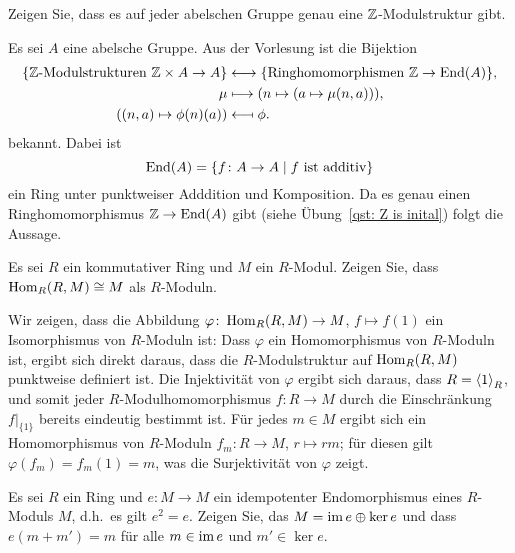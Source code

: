 \begin{question}
  Zeigen Sie, dass es auf jeder abelschen Gruppe genau eine $\mathbb{Z}$-Modulstruktur gibt.
\end{question}


\begin{solution}
  Es sei $A$ eine abelsche Gruppe.
  Aus der Vorlesung ist die Bijektion
  \begin{align*}
    \{\text{$\mathbb{Z}$-Modulstrukturen $\mathbb{Z} \times A \to A$}\}
    &\longleftrightarrow
    \{\text{Ringhomomorphismen $\mathbb{Z} \to \operatorname{End}(A)$}\},
    \\
                    \mu
    &\longmapsto    (n \mapsto (a \mapsto \mu(n,a))),
    \\
                    ( (n,a) \mapsto \phi(n)(a) )
    &\longmapsfrom  \phi.
  \end{align*}
  bekannt.
  Dabei ist
  \[
      \operatorname{End}(A)
    = \{f \colon A \to A \mid \text{$f$ ist additiv}\}
  \]
  ein Ring unter punktweiser Adddition und Komposition.
  Da es genau einen Ringhomomorphismus $\mathbb{Z} \to \operatorname{End}(A)$ gibt (siehe Übung~\ref{qst: Z is inital}) folgt die Aussage.
\end{solution}


\begin{question}
  Es sei $R$ ein kommutativer Ring und $M$ ein $R$-Modul.
  Zeigen Sie, dass $\operatorname{Hom}_R(R, M) \cong M$ als $R$-Moduln.
\end{question}


\begin{solution}
  Wir zeigen, dass die Abbildung $\varphi \colon \operatorname{Hom}_R(R, M) \to M$, $f \mapsto f(1)$ ein Isomorphismus von $R$-Moduln ist:
  Dass $\varphi$ ein Homomorphismus von $R$-Moduln ist, ergibt sich direkt daraus, dass die $R$-Modulstruktur auf $\operatorname{Hom}_R(R, M)$ punktweise definiert ist.
  Die Injektivität von $\varphi$ ergibt sich daraus, dass $R = \left\langle 1 \right\rangle_R$, und somit jeder $R$-Modulhomomorphismus $f \colon R \to M$ durch die Einschränkung $f|_{\{1\}}$ bereits eindeutig bestimmt ist.
  Für jedes $m \in M$ ergibt sich ein Homomorphismus von $R$-Moduln $f_m \colon R \to M$, $r \mapsto rm$;
  für diesen gilt $\varphi(f_m) = f_m(1) = m$, was die Surjektivität von $\varphi$ zeigt.
\end{solution}


\begin{question}
  Es sei $R$ ein Ring und $e \colon M \to M$ ein idempotenter Endomorphismus eines $R$-Moduls $M$, d.h.\ es gilt $e^2 = e$.
  Zeigen Sie, das $M = \operatorname{im} e \oplus \ker e$ und dass $e(m + m') = m$ für alle $m \in \operatorname{im} e$ und $m' \in \ker e$.
\end{question}


